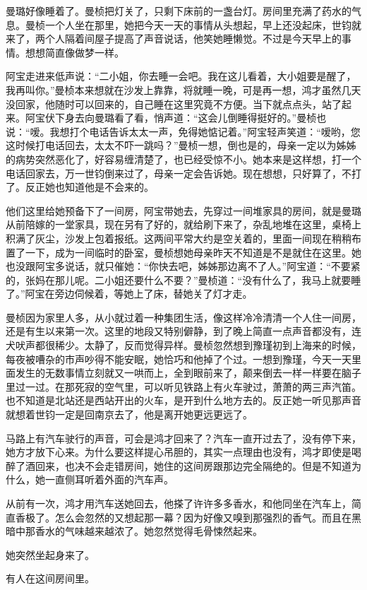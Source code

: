 \par 曼璐好像睡着了。曼桢把灯关了，只剩下床前的一盏台灯。房间里充满了药水的气息。曼桢一个人坐在那里，她把今天一天的事情从头想起，早上还没起床，世钧就来了，两个人隔着间屋子提高了声音说话，他笑她睡懒觉。不过是今天早上的事情。想想简直像做梦一样。
\par 阿宝走进来低声说：“二小姐，你去睡一会吧。我在这儿看着，大小姐要是醒了，我再叫你。”曼桢本来想就在沙发上靠靠，将就睡一晚，可是再一想，鸿才虽然几天没回家，他随时可以回来的，自己睡在这里究竟不方便。当下就点点头，站了起来。阿宝伏下身去向曼璐看了看，悄声道：“这会儿倒睡得挺好的。”曼桢也说：“嗳。我想打个电话告诉太太一声，免得她惦记着。”阿宝轻声笑道：“嗳哟，您这时候打电话回去，太太不吓一跳吗？”曼桢一想，倒也是的，母亲一定以为姊姊的病势突然恶化了，好容易缠清楚了，也已经受惊不小。她本来是这样想，打一个电话回家去，万一世钧倒来过了，母亲一定会告诉她。现在想想，只好算了，不打了。反正她也知道他是不会来的。
\par 他们这里给她预备下了一间房，阿宝带她去，先穿过一间堆家具的房间，就是曼璐从前陪嫁的一堂家具，现在另有了好的，就给刷下来了，杂乱地堆在这里，桌椅上积满了灰尘，沙发上包着报纸。这两间平常大约是空关着的，里面一间现在稍稍布置了一下，成为一间临时的卧室，曼桢想她母亲昨天不知道是不是就住在这里。她也没跟阿宝多说话，就只催她：“你快去吧，姊姊那边离不了人。”阿宝道：“不要紧的，张妈在那儿呢。二小姐还要什么不要？”曼桢道：“没有什么了，我马上就要睡了。”阿宝在旁边伺候着，等她上了床，替她关了灯才走。
\par 曼桢因为家里人多，从小就过着一种集团生活，像这样冷冷清清一个人住一间房，还是有生以来第一次。这里的地段又特别僻静，到了晚上简直一点声音都没有，连犬吠声都很稀少。太静了，反而觉得异样。曼桢忽然想到豫瑾初到上海来的时候，每夜被嘈杂的市声吵得不能安眠，她恰巧和他掉了个过。一想到豫瑾，今天一天里面发生的无数事情立刻就又一哄而上，全到眼前来了，颠来倒去一样一样要在脑子里过一过。在那死寂的空气里，可以听见铁路上有火车驶过，萧萧的两三声汽笛。也不知道是北站还是西站开出的火车，是开到什么地方去的。反正她一听见那声音就想着世钧一定是回南京去了，他是离开她更远更远了。
\par 马路上有汽车驶行的声音，可会是鸿才回来了？汽车一直开过去了，没有停下来，她方才放下心来。为什么要这样提心吊胆的，其实一点理由也没有，鸿才即使是喝醉了酒回来，也决不会走错房间，她住的这间房跟那边完全隔绝的。但是不知道为什么，她一直侧耳听着外面的汽车声。
\par 从前有一次，鸿才用汽车送她回去，他搽了许许多多香水，和他同坐在汽车上，简直香极了。怎么会忽然的又想起那一幕？因为好像又嗅到那强烈的香气。而且在黑暗中那香水的气味越来越浓了。她忽然觉得毛骨悚然起来。
\par 她突然坐起身来了。
\par 有人在这间房间里。

